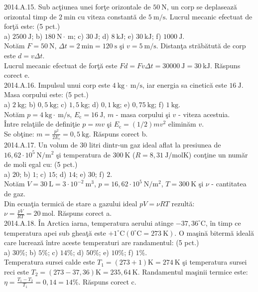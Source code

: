 2014.A.15. Sub acţiunea unei forţe orizontale de $50 \mathrm{~N}$, un corp se deplasează orizontal timp de $2 \mathrm{~min}$ cu viteza constantă de $5 \mathrm{~m} / \mathrm{s}$. Lucrul mecanic efectuat de forţă este: (5 pct.)\\ a) $2500 \mathrm{~J}$; b) $180 \mathrm{~N} \cdot \mathrm{~m}$; c) $30 \mathrm{~J}$; d) $8 \mathrm{~kJ}$; e) $30 \mathrm{~kJ}$; f) $1000 \mathrm{~J}$.\\ Notăm $F=50 \mathrm{~N}$, $\Delta t=2 \mathrm{~min}=120 \mathrm{~s}$ şi $v=5 \mathrm{~m} / \mathrm{s}$. Distanţa străbătută de corp este $d=v \Delta t$.\\ Lucrul mecanic efectuat de forţă este $F d=F v \Delta t=30000 \mathrm{~J}=30 \mathrm{~kJ}$. Răspuns corect e.\\

2014.A.16. Impulsul unui corp este $4 \mathrm{~kg} \cdot \mathrm{~m} / \mathrm{s}$, iar energia sa cinetică este $16 \mathrm{~J}$. Masa corpului este: (5 pct.)\\ a) $2 \mathrm{~kg}$; b) $0,5 \mathrm{~kg}$; c) $1,5 \mathrm{~kg}$; d) $0,1 \mathrm{~kg}$; e) $0,75 \mathrm{~kg}$; f) $1 \mathrm{~kg}$.\\ Notăm $p=4 \mathrm{~kg} \cdot \mathrm{~m} / \mathrm{s}$, $E_{\mathrm{c}}=16 \mathrm{~J}$, $m$ - masa corpului şi $v$ - viteza acestuia.\\ Între relaţiile de definiţie $p=m v$ şi $E_{\mathrm{c}}=(1 / 2) m v^{2}$ eliminăm $v$.\\ Se obţine: $m=\frac{p^{2}}{2 E_{\mathrm{c}}}=0,5 \mathrm{~kg}$. Răspuns corect b.\\

2014.A.17. Un volum de $30$ litri dintr-un gaz ideal aflat la presiunea de $16,62 \cdot 10^{5} \mathrm{~N} / \mathrm{m}^{2}$ şi temperatura de $300 \mathrm{~K}$ ($R=8,31 \mathrm{~J} / \mathrm{mol} \mathrm{K}$) conţine un număr de moli egal cu: (5 pct.)\\ a) $20$; b) $1$; c) $15$; d) $14$; e) $30$; f) $2$.\\ Notăm $V=30 \mathrm{~L}=3 \cdot 10^{-2} \mathrm{~m}^{3}$, $p=16,62 \cdot 10^{5} \mathrm{~N} / \mathrm{m}^{2}$, $T=300 \mathrm{~K}$ şi $\nu$ - cantitatea de gaz.\\ Din ecuaţia termică de stare a gazului ideal $p V=\nu R T$ rezultă:\\ $\nu=\frac{p V}{R T}=20 \mathrm{~mol}$. Răspuns corect a.\\

2014.A.18. În Arctica iarna, temperatura aerului atinge $-37,36^{\circ} \mathrm{C}$, în timp ce temperatura apei sub gheaţă este $+1^{\circ} \mathrm{C}\left(0^{\circ} \mathrm{C}=273 \mathrm{~K}\right)$. O maşină bitermă ideală care lucrează între aceste temperaturi are randamentul: (5 pct.)\\ a) $30 \%$; b) $5 \%$; c) $14 \%$; d) $50 \%$; e) $10 \%$; f) $1 \%$.\\ Temperatura sursei calde este $T_{1}=(273+1) \mathrm{K}=274 \mathrm{~K}$ şi temperatura sursei reci este $T_{2}=(273-37,36) \mathrm{K}=235,64 \mathrm{~K}$. Randamentul maşinii termice este:\\ $\eta=\frac{T_{1}-T_{2}}{T_{1}}=0,14=14 \%$. Răspuns corect c.\\

